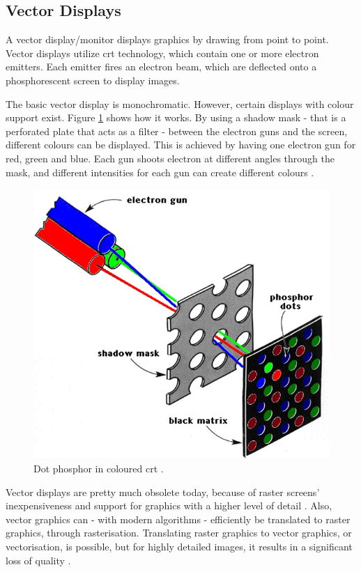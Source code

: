 \subsection{Vector Displays}
A vector display/monitor displays graphics by drawing from point to point.
Vector displays utilize \gls{crt} technology, which contain one or more electron emitters. Each emitter fires an electron beam, which are deflected onto a phosphorescent screen to display images.

The basic vector display is monochromatic.
However, certain displays with colour support exist.
Figure \ref{fig:color_crt} shows how it works.
By using a shadow mask - that is a perforated plate that acts as a filter - between the electron guns and the screen, different colours can be displayed.
This is achieved by having one electron gun for red, green and blue.
Each gun shoots electron at different angles through the mask, and different intensities for each gun can create different colours \cite{monitors}.

\begin{figure}
	\centering
	\includegraphics[width=0.5 \textwidth]{images/color_crt.jpg}
	\caption{Dot phosphor in coloured \gls{crt} \cite{monitors}.}
	\label{fig:color_crt}
\end{figure}

Vector displays are pretty much obsolete today, because of raster screens' inexpensiveness and support for graphics with a higher level of detail \cite{lcd-vs-crt}.
Also, vector graphics can - with modern algorithms - efficiently be translated to raster graphics, through rasterisation.
Translating raster graphics to vector graphics, or vectorisation, is possible, but for highly detailed images, it results in a significant loss of quality \cite{vectorisation}.
